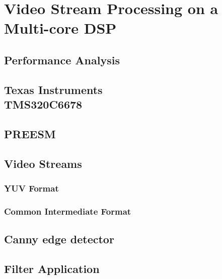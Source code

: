 \chapter{Video Stream Processing on a Multi-core DSP}
\label{chapter:experiments}


\section{Performance Analysis}
\label{sec:performance-analysis}


\section[Texas Instruments TMS320C6678]{Texas Instruments\\TMS320C6678}
\label{sec:c6678}


\section{PREESM}
\label{sec:preesm}


\section{Video Streams}
\label{sec:video-streams}

\subsection{YUV Format}
\label{subsec:yuv}

\subsection{Common Intermediate Format}
\label{subsec:cif}

\section{Canny edge detector}
\label{sec:canny}


\section{Filter Application}
\label{sec:filterapp}


